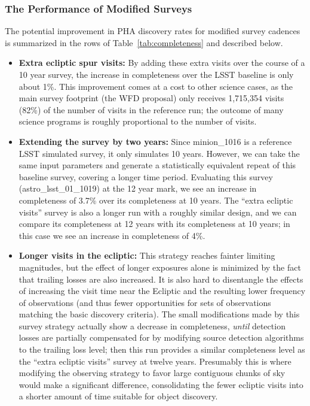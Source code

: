 \subsubsection{The Performance of Modified Surveys}

The potential improvement in PHA discovery rates for modified survey cadences is
summarized in the rows of Table~\ref{tab:completeness} and described below.

\begin{itemize}
\item \textbf{Extra ecliptic spur visits:} By adding these extra visits over the course of a 10 year survey, the increase in completeness over the LSST baseline is only about 1\%. This improvement comes at a cost to other science cases, as the main survey footprint (the WFD proposal) only receives 1,715,354 visits (82\%) of the number of visits in the reference run; the outcome of many science programs is roughly proportional to the number of visits.
\item \textbf{Extending the survey by two years:} Since minion\_1016 is a reference LSST simulated survey, it only simulates 10 years.
However, we can take the same input parameters and generate a statistically equivalent repeat of this baseline survey, covering a longer time period. Evaluating this survey (astro\_lsst\_01\_1019) at the 12 year mark, we see an increase in completeness of 3.7\% over its completeness at 10 years. The ``extra ecliptic visits'' survey is also a longer run with a roughly similar design, and we can compare its completeness at 12 years with its completeness at 10 years; in this case we see an increase in completeness of 4\%.
\item \textbf{Longer visits in the ecliptic:} This strategy reaches fainter limiting magnitudes, but the effect of longer exposures alone is minimized by the fact that trailing losses are also increased. It is also hard to disentangle the effects of increasing the visit time near the Ecliptic and the resulting lower frequency of observations (and thus fewer opportunities for sets of observations matching the basic discovery criteria). The small modifications made by this survey strategy actually show a decrease in completeness, {\it until} detection losses are partially compensated for by modifying source detection algorithms to the trailing loss level; then this run provides a similar completeness level as the ``extra ecliptic visits'' survey at twelve years. Presumably this is where modifying the observing strategy to favor large contiguous chunks of sky would make a significant difference, consolidating the fewer ecliptic visits into a shorter amount of time suitable for object discovery.

\end{itemize}

